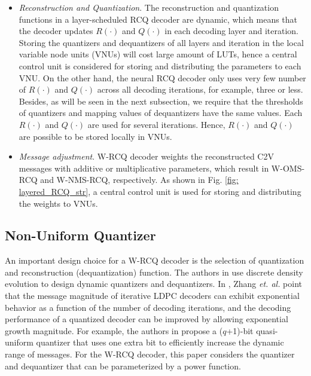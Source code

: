 \documentclass [PhD] {uclathes}
\begin{document}
\begin{itemize}
    \item \textit{Reconstruction and Quantization}. The reconstruction and quantization functions in a layer-scheduled RCQ decoder are dynamic, which means that the decoder updates $R(\cdot)$ and $Q(\cdot)$ in each decoding layer and iteration. Storing the quantizers and dequantizers of all layers and iteration in the local variable node units (VNUs) will cost large amount of LUTs, hence a central control unit is considered for storing and distributing the parameters to each VNU\cite{terrill2021fpga}. 
    On the other hand, the neural RCQ decoder only uses very few number of $R(\cdot)$ and $Q(\cdot)$ across all decoding iterations, for example, three or less. Besides, as will be seen in the next subsection, we require that the thresholds of quantizers and mapping values of dequantizers have the same values. Each $R(\cdot)$ and $Q(\cdot)$ are used for several iterations. Hence,  $R(\cdot)$ and $Q(\cdot)$ are possible to be stored locally in VNUs.
    \item \textit{Message adjustment}. W-RCQ decoder weights the reconstructed C2V messages with additive or multiplicative parameters, which result in W-OMS-RCQ and W-NMS-RCQ, respectively. As shown in Fig. \ref{fig: layered_RCQ_str}, a central control unit is used for storing and distributing the weights to VNUs.
\end{itemize}

\subsection{Non-Uniform Quantizer}
An important design choice for a W-RCQ decoder is  the selection of quantization and reconstruction (dequantization) function. The authors in \cite{wang2022TCOMRCQ} use discrete density evolution to design dynamic quantizers and dequantizers. In \cite{Zhang2014-ib}, Zhang \emph{et. al.} point that  the message magnitude of iterative LDPC decoders can exhibit exponential behavior as a function of the number of decoding iterations, and the decoding performance of a quantized decoder can be improved by allowing exponential growth magnitude.  For example,  the authors in \cite{Zhang2014-ib} propose a ($q$+1)-bit quasi-uniform quantizer that uses one extra bit to efficiently
increase the dynamic range of messages.
For the W-RCQ decoder, this paper considers the quantizer and dequantizer that can be parameterized by a power function. 
\end{document}
